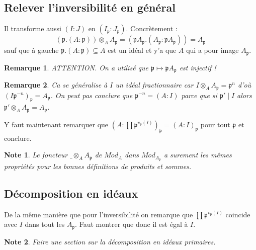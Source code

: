 \documentclass[a4paper,12pt]{book}
\newcommand{\p}{\mathfrak p}
\theoremstyle{plain}
\newtheorem{rem}{Remarque}
\newtheorem{note}{Note}
\theoremstyle{definition}
\theoremstyle{remark}
\begin{document}
\subsection{Relever l'inversibilité en général}

Il transforme aussi $(I : J)$ en $(I_\p:J_\p)$.
Concrètement :
\[(\p.(A:\p))\otimes_A A_\p = (\p A_\p.(A_\p:\p A_\p))=A_\p\]
sauf que à gauche $\p.(A:\p)\subseteq A$ est un idéal et y'a
que $A$ qui a pour image $A_\p$.
\begin{rem}
    ATTENTION. On a utilisé que $\p \mapsto \p A_\p$ est injectif !
\end{rem}
\begin{rem}
    Ca se généralise à $I$ un idéal fractionnaire car
    $I\otimes_A A_\p=\p^n$ d'où $(I\p^{-n})_\p=A_\p$. On peut 
    pas conclure que $\p^{-n}=(A:I)$ parce que si $\p'\mid I$ 
    alors $\p'\otimes_A A_\p=A_\p$. 
\end{rem}
Y faut maintenant remarquer que 
$(A:\prod \p^{v_\p(I)})_\p=(A:I)_\p$ pour tout $\p$ et conclure.

\begin{note}
    Le foncteur $\_\otimes_A A_\p$ de $Mod_A$ dans $Mod_{A_\p}$
    a surement les mêmes propriétés pour les bonnes définitions
    de produits et sommes.
\end{note}
\subsection{Décomposition en idéaux}
De la même manière que pour l'inversibilité on remarque que 
$\prod \p^{v_\p(I)}$ coincide avec $I$ dans
tout les $A_\p$. Faut montrer que donc il est égal à $I$.

\begin{note}
    Faire une section sur la décomposition en idéaux primaires.
\end{note}
\end{document}
